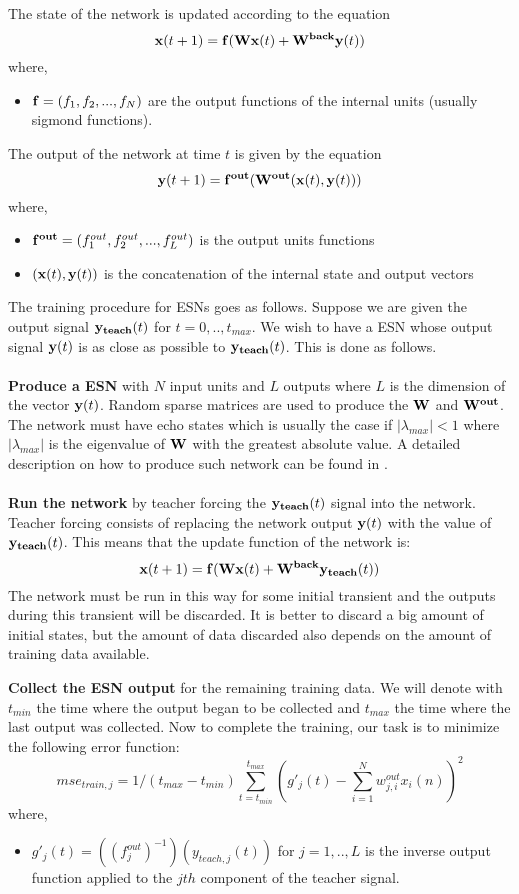 \documentclass[10pt]{article}
\begin{document}
The state of the network is updated according to the equation
\[
{\bf x}(t+1)={\bf f}({\bf Wx}(t) + {\bf W^{back}y}(t))
\]
where,
\begin{itemize}
  \item ${\bf f}=(f_1,f_2,...,f_N)$ are the output functions of the internal units (usually sigmond functions).
\end{itemize}
\pagebreak
The output of the network at time $t$ is given by the equation
\[
{\bf y}(t+1)={\bf f^{out}}({\bf W^{out}}({\bf x}(t),{\bf y}(t)))
\]
where,
\begin{itemize}
  \item ${\bf f^{out}}=(f_1^{out},f_2^{out},...,f_L^{out})$ is the output units functions
  \item $({\bf x}(t),{\bf y}(t))$ is the concatenation of the internal state and output vectors
\end{itemize}
The training procedure for ESNs goes as follows. Suppose we are given the output signal ${\bf y_{teach}}(t)$ for $t=0,..,t_{max}$. We wish to have a ESN whose output signal ${\bf y}(t)$ is as close as possible to ${\bf y_{teach}}(t)$. This is done as follows.\\\\
{\bf Produce a ESN} with $N$ input units and $L$ outputs where $L$ is the dimension of the vector ${\bf y}(t)$. Random sparse matrices are used to produce the ${\bf W}$ and ${\bf W^{out}}$. The network must have echo states which is usually the case if $|\lambda_{max}| < 1$ where $|\lambda_{max}|$ is the eigenvalue of ${\bf W}$ with the greatest absolute value. A detailed description on how to produce such network can be found in \cite{JaegerESNTutorial}.\\\\
{\bf Run the network} by teacher forcing the ${\bf y_{teach}}(t)$ signal into the network. Teacher forcing consists of replacing the network output ${\bf y}(t)$ with the value of ${\bf y_{teach}}(t)$. This means that the update function of the network is:
\[
{\bf x}(t+1)={\bf f}({\bf Wx}(t)+{\bf W^{back}y_{teach}}(t))
\]
The network must be run in this way for some initial transient and the outputs during this transient will be discarded. It is better to discard a big amount of initial states, but the amount of data discarded also depends on the amount of training data available.\pagebreak

{\bf Collect the ESN output} for the remaining training data. We will denote with $t_{min}$ the time where the output began to be collected and $t_{max}$ the time where the last output was collected. Now to complete the training, our task is to minimize the following error function:
\[
mse_{train,j} = 1/(t_{max}-t_{min})\sum_{t=t_{min}}^{t_{max}}(g'_j(t) - \sum_{i=1}^{N}w_{j,i}^{out}x_i(n))^2
\]
where, 
\begin{itemize}
  \item $g'_j(t)=((f_j^{out})^{-1})(y_{teach,j}(t))$ for $j=1,..,L$ is the inverse output function applied to the $jth$ component of the teacher signal. 
\end{itemize}
\end{document}
